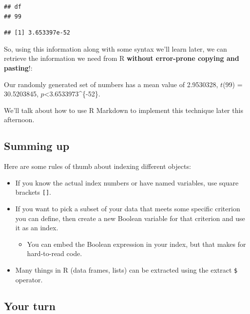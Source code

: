 \documentclass[]{article}
\newenvironment{Shaded}{\begin{snugshade}}{\end{snugshade}}
\newcommand{\DecValTok}[1]{\textcolor[rgb]{0.00,0.00,0.81}{#1}}
\newcommand{\CommentTok}[1]{\textcolor[rgb]{0.56,0.35,0.01}{\textit{#1}}}
\newcommand{\OperatorTok}[1]{\textcolor[rgb]{0.81,0.36,0.00}{\textbf{#1}}}
\newcommand{\NormalTok}[1]{#1}
\providecommand{\tightlist}{%
  \setlength{\itemsep}{0pt}\setlength{\parskip}{0pt}}
\begin{document}
\begin{verbatim}
## df 
## 99
\end{verbatim}

\begin{Shaded}
\end{Shaded}

\begin{verbatim}
## [1] 3.653397e-52
\end{verbatim}

So, using this information along with some syntax we'll learn later, we
can retrieve the information we need from R \textbf{without error-prone
copying and pasting}!:

Our randomly generated set of numbers has a mean value of 2.9530328,
\(t\)(99) = 30.5203845, \(p\)\textless{}3.6533973\^{}\{-52\}.

We'll talk about how to use R Markdown to implement this technique later
this afternoon.

\subsection{Summing up}\label{summing-up-1}

Here are some rules of thumb about indexing different objects:

\begin{itemize}
\tightlist
\item
  If you know the actual index numbers or have named variables, use
  square brackets \texttt{{[}{]}}.
\item
  If you want to pick a subset of your data that meets some specific
  criterion you can define, then create a new Boolean variable for that
  criterion and use it as an index.

  \begin{itemize}
  \tightlist
  \item
    You can embed the Boolean expression in your index, but that makes
    for hard-to-read code.
  \end{itemize}
\item
  Many things in R (data frames, lists) can be extracted using the
  extract \texttt{\$} operator.
\end{itemize}

\subsection{Your turn}\label{your-turn-3}
\end{document}
